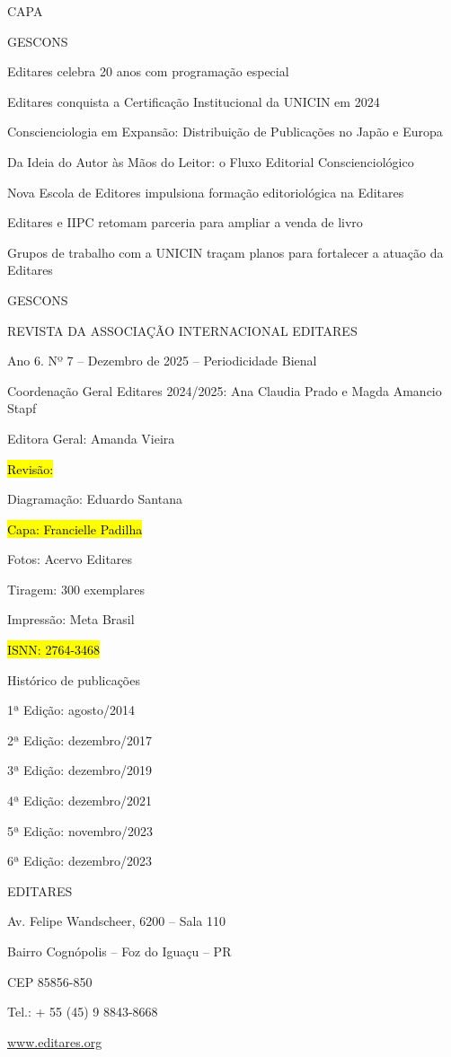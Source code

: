 CAPA

GESCONS

Editares celebra 20 anos com programação especial

Editares conquista a Certificação Institucional da UNICIN em 2024

Conscienciologia em Expansão: Distribuição de Publicações no Japão e Europa

Da Ideia do Autor às Mãos do Leitor: o Fluxo Editorial Conscienciológico

Nova Escola de Editores impulsiona formação editoriológica na Editares

Editares e IIPC retomam parceria para ampliar a venda de livro

Grupos de trabalho com a UNICIN traçam planos para fortalecer a atuação da Editares

GESCONS

REVISTA DA ASSOCIAÇÃO INTERNACIONAL EDITARES

Ano 6. Nº 7 -- Dezembro de 2025 -- Periodicidade Bienal

Coordenação Geral Editares 2024/2025: Ana Claudia Prado e Magda Amancio Stapf

Editora Geral: Amanda Vieira

\hl{Revisão:}

Diagramação: Eduardo Santana

\hl{Capa: Francielle Padilha}

Fotos: Acervo Editares

Tiragem: 300 exemplares

Impressão: Meta Brasil

\hl{ISNN: 2764-3468}

Histórico de publicações

1ª Edição: agosto/2014

2ª Edição: dezembro/2017

3ª Edição: dezembro/2019

4ª Edição: dezembro/2021

5ª Edição: novembro/2023

6ª Edição: dezembro/2023

EDITARES

Av. Felipe Wandscheer, 6200 -- Sala 110

Bairro Cognópolis -- Foz do Iguaçu -- PR

CEP 85856-850

Tel.: + 55 (45) 9 8843-8668

\href{http://www.editares.org}{\ul{www.editares.org}}

